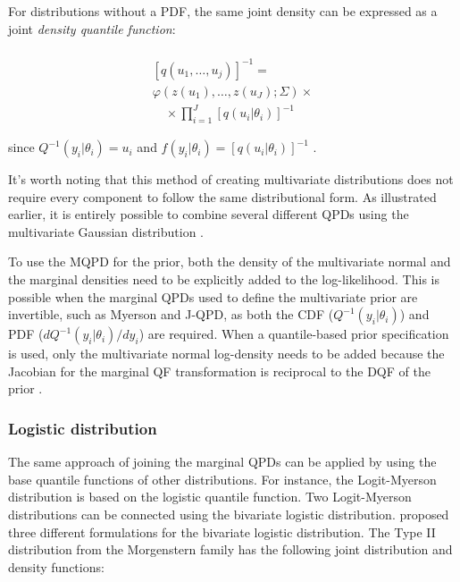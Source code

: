 \documentclass[
  fleqn,
  deca,
  blindrev
]{informs4}
\begin{document}
For distributions without a PDF, the same joint density can be expressed
as a joint \emph{density quantile function}:

\[
\begin{gathered}
\\
[q(u_1,\dots,u_j)]^{-1}=\\
\varphi(z(u_1),\dots,z(u_J);\Sigma)\times\\
\quad \times \prod_{i=1}^{J}[q(u_i\vert\theta_i)]^{-1}
\end{gathered}
\]

since \(Q^{-1}(y_i\vert\theta_i)=u_i\) and
\(f(y_i\vert\theta_i)=[q(u_i\vert\theta_i)]^{-1}\)
\citep{gilchrist2000StatisticalModellingQuantile}.

It's worth noting that this method of creating multivariate
distributions does not require every component to follow the same
distributional form. As illustrated earlier, it is entirely possible to
combine several different QPDs using the multivariate Gaussian
distribution \citep{drovandi2011LikelihoodfreeBayesianEstimation}.

To use the MQPD for the prior, both the density of the multivariate
normal and the marginal densities need to be explicitly added to the
log-likelihood. This is possible when the marginal QPDs used to define
the multivariate prior are invertible, such as Myerson and J-QPD, as
both the CDF (\(Q^{-1}(y_i\vert\theta_i)\)) and PDF
(\(dQ^{-1}(y_i\vert\theta_i)/dy_i\)) are required. When a quantile-based
prior specification is used, only the multivariate normal log-density
needs to be added because the Jacobian for the marginal QF
transformation is reciprocal to the DQF of the prior
\citep{perepolkin2023TenetsQuantilebasedInference}.

\subsubsection{Logistic distribution}\label{logistic-distribution}

The same approach of joining the marginal QPDs can be applied by using
the base quantile functions of other distributions. For instance, the
Logit-Myerson distribution \citep{wilson2023ReconciliationExpertPriors}
is based on the logistic quantile function. Two Logit-Myerson
distributions can be connected using the bivariate logistic
distribution. \citet{gumbel1961BivariateLogisticDistributions} proposed
three different formulations for the bivariate logistic distribution.
The Type II distribution from the Morgenstern family
\citep{sajeevkumar2014EstimationParameterMorgenstern, basikhasteh2021BayesianEstimationMorgenstern}
has the following joint distribution and density functions:
\end{document}
